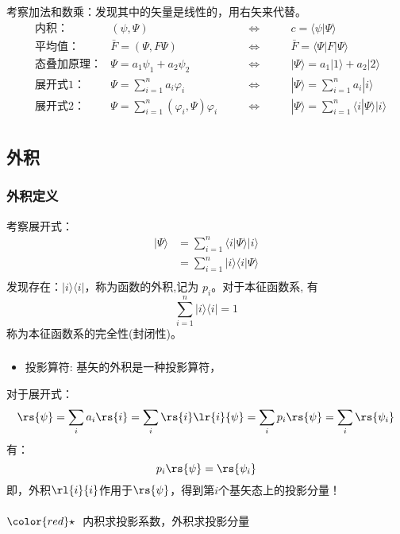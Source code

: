 \begin{frame}
    \frametitle{}
    考察加法和数乘：发现其中的矢量是线性的，用右矢来代替。\\
    $$\begin{aligned}
    &\text{内积：}   & (\psi,\Psi)  & \qquad\Leftrightarrow \qquad & c=\langle \psi | \Psi \rangle \\
    &\text{平均值：}   & \bar{F}=(\Psi,F\Psi)  & \qquad\Leftrightarrow \qquad & \bar{F} =\langle \Psi|F | \Psi \rangle \\
    &\text{态叠加原理：}   & \Psi=a_1 \psi_1+ a_2 \psi_2  & \qquad\Leftrightarrow \qquad &| \Psi \rangle =a_1 |1 \rangle+ a_2 |2 \rangle\\
    &\text{展开式1：}     & \Psi=\sum\limits_{i=1} ^n a_i \varphi_i & \qquad \Leftrightarrow \qquad &| \Psi \rangle =\sum\limits_{i=1} ^n a_i |i \rangle\\
    &\text{展开式2：}     & \Psi=\sum\limits_{i=1} ^n (\varphi_i ,\Psi) \varphi_i & \qquad \Leftrightarrow \qquad &| \Psi \rangle =\sum\limits_{i=1} ^n \langle i | \Psi \rangle |i\rangle\\
    \end{aligned}
    $$
\end{frame} 
 
\subsection{外积}

\begin{frame}
    \frametitle{外积定义}
    考察展开式：
    $$\begin{aligned}
    |\Psi \rangle &= \sum\limits_{i=1} ^n \langle i | \Psi \rangle |i\rangle\\
                 &= \sum\limits_{i=1} ^n |i\rangle\langle i | \Psi \rangle \\
    \end{aligned}
    $$
    发现存在：$|i\rangle\langle i|$，称为函数的外积,记为 $p_i$。对于本征函数系, 有
    \[\sum\limits_{i=1} ^n |i\rangle\langle i |=1\]
    称为本征函数系的完全性(封闭性)。 
\end{frame} 

\begin{frame}
    \frametitle{}
    \begin{itemize}
    \item 投影算符: 基矢的外积是一种投影算符，
    \end{itemize}
    对于展开式： 
    \[\rs{\psi}=\sum_i a_i \rs{i}=\sum_i \rs{i} \lr{i}{\psi}=\sum_i p_i \rs{\psi} =\sum_i \rs{\psi_i}\]
    有：\[p_i \rs{\psi} =\rs{\psi_i}\]
    即，外积$\rl{i}{i}$作用于$\rs{\psi}$，得到第$i$个基矢态上的投影分量！\\
    ~~\\ 
    ${\color{red}\star}~$ 内积求投影系数，外积求投影分量
\end{frame}

